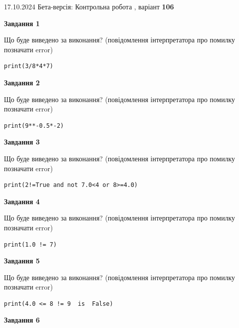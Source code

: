 \documentclass[12pt, ukrainian]{article}
\begin{document}
{\Large{17.10.2024 Бета-версія: Контрольна робота , варіант  \No \textbf { 106 }\par}}
{
\begin {large}
{\begin {center}\textbf{Завдання 1}\end {center}}

Що буде виведено за виконання? (повідомлення інтерпретатора про помилку позначати error)\par
\begin{verbatim}
print(3/8*4*7)
\end{verbatim}

{\begin {center}\textbf{Завдання 2}\end {center}}

Що буде виведено за виконання? (повідомлення інтерпретатора про помилку позначати error)\par
\begin{verbatim}
print(9**-0.5*-2)
\end{verbatim}

{\begin {center}\textbf{Завдання 3}\end {center}}

Що буде виведено за виконання? (повідомлення інтерпретатора про помилку позначати error)\par
\begin{verbatim}
print(2!=True and not 7.0<4 or 8>=4.0)
\end{verbatim}

{\begin {center}\textbf{Завдання 4}\end {center}}

Що буде виведено за виконання? (повідомлення інтерпретатора про помилку позначати error)\par
\begin{verbatim}
print(1.0 != 7)
\end{verbatim}

{\begin {center}\textbf{Завдання 5}\end {center}}

Що буде виведено за виконання? (повідомлення інтерпретатора про помилку позначати error)\par
\begin{verbatim}
print(4.0 <= 8 != 9  is  False)
\end{verbatim}

{\begin {center}\textbf{Завдання 6}\end {center}}


\end{large}}
\end{document}
